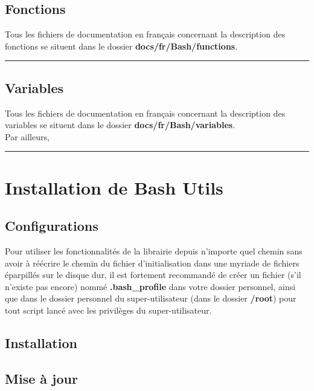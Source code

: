 \documentclass[a4paper,10pt]{article}
\begin{document}
\color{green}
\subsection{Fonctions}\color{white}
Tous les fichiers de documentation en français concernant la description des fonctions se situent dans le dossier \color{lime}\textbf{docs/fr/Bash/functions}\color{white}.\\[1\baselineskip]



\color{green}\par\noindent\rule{\textwidth}{0.4pt}\color{white}

\color{green}
\subsection{Variables}\color{white}
Tous les fichiers de documentation en français concernant la description des variables se situent dans le dossier \color{lime}\textbf{docs/fr/Bash/variables}\color{white}.\\[1\baselineskip]

Par ailleurs, \\[1\baselineskip]

\color{red}\par\noindent\rule{\textwidth}{0.4pt}\color{white}

\color{red}
\section{Installation de Bash Utils}\color{white}

\color{green}
\subsection{Configurations}\color{white}
Pour utiliser les fonctionnalités de la librairie depuis n'importe quel chemin sans avoir à réécrire le chemin du fichier d'initialisation dans une myriade de fichiers éparpillés sur le disque dur, il est fortement recommandé de créer un fichier (s'il n'existe pas encore) nommé \color{lime}\textbf{.bash\_profile}\color{white} dans votre dossier personnel, ainsi que dans le dossier personnel du super-utilisateur (dans le dossier \color{lime}\textbf{/root}\color{white}) pour tout script lancé avec les privilèges du super-utilisateur.

\color{green}
\subsection{Installation}\color{white}

\color{green}
\subsection{Mise à jour}\color{white}
\end{document}
